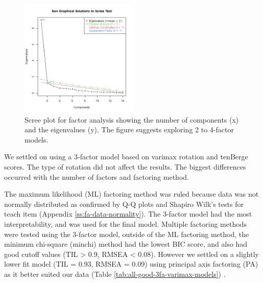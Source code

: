 \documentclass[020-persona\_validation.tex]{subfiles}
\begin{document}
        \begin{figure}[htb!]
            \centering
            \includegraphics[width=0.5\textwidth]{figs/010-validation/efa_eigen_scree_good.png}
            \caption[Scree plot for factor analysis]
            {Scree plot for factor analysis showing the number of components (x) and the eigenvalues (y).
                The figure suggests exploring 2 to 4-factor models.
            }
            \label{fig:scree-fa-good}
        \end{figure}

        We settled on using a 3-factor model based on
        varimax rotation and
        tenBerge scores.
        The type of rotation did not affect the results.
        The biggest differences occurred with the number of factors and factoring method.

        The maximum likelihood (ML) factoring method was ruled because data was not normally distributed
        as confirmed by Q-Q plots and Shapiro Wilk's tests for teach item (Appendix \ref{ss:fa-data-normality}).
        The 3-factor model had the most interpretability, and was used for the final model.
        Multiple factoring methods were tested using the 3-factor model,
        outside of the ML factoring method, the minimum chi-square (minchi) method had the lowest BIC score,
        and also had good cutoff values (TIL > 0.9, RMSEA < 0.08).
        However we settled on a slightly lower fit model (TIL = 0.93, RMSEA = 0.09) using principal axis factoring (PA)
        as it better suited our data (Table \ref{tab:all-good-3fa-varimax-models})
        \cite{arifinExploratoryFactorAnalysis2017}.
\end{document}
